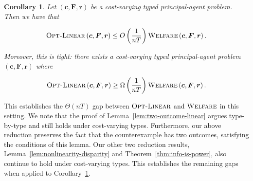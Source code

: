 \documentclass{article}
\newtheorem{corollary}[theorem]{Corollary}
\newcommand{\costvector}{\bm{c}}
\newcommand{\ForecastTensor}{\bm{F}}
\newcommand{\rewardvector}{\bm{r}}
\newcommand{\PrincipalAgentProblem}{\left(\costvector, \ForecastTensor, \rewardvector\right)}
\newcommand{\OWelfare}{\textsc{Welfare}}
\newcommand{\OLinear}{\textsc{Opt-Linear}}
\begin{document}
\begin{corollary}\label{cor:ntgap}
Let $\PrincipalAgentProblem$ be a cost-varying typed principal-agent problem. Then we have that

$$\OLinear \PrincipalAgentProblem \leq O\left(\frac{1}{nT}\right)\OWelfare\PrincipalAgentProblem.$$

Moreover, this is tight: there exists a cost-varying typed principal-agent problem $\PrincipalAgentProblem$ where

$$\OLinear \PrincipalAgentProblem \geq \Omega\left(\frac{1}{nT}\right)\OWelfare\PrincipalAgentProblem.$$
\end{corollary}

This establishes the $\Theta(nT)$ gap between $\OLinear$ and $\OWelfare$ in this setting. We note that the proof of Lemma~\ref{lem:two-outcome-linear} argues type-by-type and still holds under cost-varying types. Furthermore, our above reduction preserves the fact that the counterexample has two outcomes, satisfying the conditions of this lemma. Our other two reduction results, Lemma~\ref{lem:nonlinearity-disparity} and Theorem~\ref{thm:info-is-power}, also continue to hold under cost-varying types. This establishes the remaining gaps when applied to Corollary~\ref{cor:ntgap}. %
\end{document}
